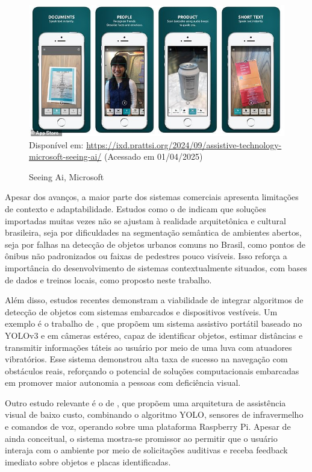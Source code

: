 \begin{figure}[htbp]
  \centering
  \caption{Seeing Ai, Microsoft}
  \includegraphics[width=0.8 \textwidth]{Figuras/seeing-ai.jpg}
  \\
  Disponível em: \url{https://ixd.prattsi.org/2024/09/assistive-technology-microsoft-seeing-ai/} (Acessado em 01/04/2025)
  \label{fg-seeing-ai}
\end{figure}

Apesar dos avanços, a maior parte dos sistemas comerciais apresenta limitações de contexto e adaptabilidade. Estudos como o de  indicam que soluções importadas muitas vezes não se ajustam à realidade arquitetônica e cultural brasileira, seja por dificuldades na segmentação semântica de ambientes abertos, seja por falhas na detecção de objetos urbanos comuns no Brasil, como pontos de ônibus não padronizados ou faixas de pedestres pouco visíveis. Isso reforça a importância do desenvolvimento de sistemas contextualmente situados, com bases de dados e treinos locais, como proposto neste trabalho.

Além disso, estudos recentes demonstram a viabilidade de integrar algoritmos de detecção de objetos com sistemas embarcados e dispositivos vestíveis. Um exemplo é o trabalho de , que propõem um sistema assistivo portátil baseado no YOLOv3 e em câmeras estéreo, capaz de identificar objetos, estimar distâncias e transmitir informações táteis ao usuário por meio de uma luva com atuadores vibratórios. Esse sistema demonstrou alta taxa de sucesso na navegação com obstáculos reais, reforçando o potencial de soluções computacionais embarcadas em promover maior autonomia a pessoas com deficiência visual.

Outro estudo relevante é o de , que propõem uma arquitetura de assistência visual de baixo custo, combinando o algoritmo YOLO, sensores de infravermelho e comandos de voz, operando sobre uma plataforma Raspberry Pi. Apesar de ainda conceitual, o sistema mostra-se promissor ao permitir que o usuário interaja com o ambiente por meio de solicitações auditivas e receba feedback imediato sobre objetos e placas identificadas.

